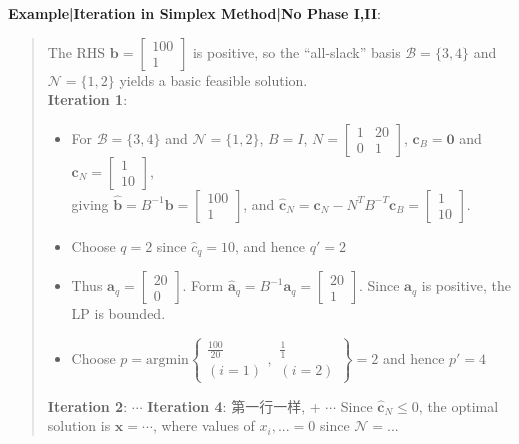 \documentclass[9pt]{article}
\begin{document}
\textbf{Example|Iteration in Simplex Method|No Phase I,II}:

\vspace{-10pt}
\begin{quote}
    \color{gray}
    \fontsize{7pt}{4pt}\selectfont
    The RHS \( \mathbf{b} = \begin{bmatrix} 100\\ 1\end{bmatrix}\) is positive, so the ``all-slack'' basis \( \mathcal{B}=\{3,4\} \) and \(\mathcal{N}=\{1,2\}\) yields a basic feasible solution. \\
    \textbf{Iteration 1}:
    \begin{itemize}[itemsep=-1pt, topsep=-1pt]
        \item For \( \mathcal{B}=\{3,4\} \) and \( \mathcal{N}=\{1,2\} \), \(B= I\), \(N=\begin{bmatrix} 1 & 20 \\ 0 & 1\end{bmatrix}\), \( \mathbf{c}_B=\mathbf{0} \) and \( \mathbf{c}_N=\begin{bmatrix} 1 \\ 10\end{bmatrix}\), \\
        giving \( \widehat{\mathbf{b}}=B^{-1}\mathbf{b}=\begin{bmatrix} 100 \\ 1\end{bmatrix} \), and \( \widehat{\mathbf{c}}_N=\mathbf{c}_N-N^TB^{-T}\mathbf{c}_B=\begin{bmatrix} 1 \\ 10\end{bmatrix} \).
        \item Choose \(q=2\) since \( \widehat{c}_q= 10 \), and hence \( q'=2 \)
        \item Thus \(\mathbf{a}_q=\begin{bmatrix}20 \\ 0\end{bmatrix}\). Form \( \widehat{\mathbf{a}}_q=B^{-1}\mathbf{a}_q=\begin{bmatrix} 20 \\ 1\end{bmatrix} \). Since \( \widehat{\mathbf{a}}_q \) is positive, the LP is bounded.
        \item Choose \(p=\text{argmin}\left\{ \begin{matrix}\frac{100}{20} \\ (i=1)\end{matrix}, \begin{matrix}\frac{1}{1} \\ (i=2)\end{matrix}  \right\}=2 \) and hence \( p'=4 \)
    \end{itemize}
    \textbf{Iteration 2}: \(\cdots\)
    \textbf{Iteration 4}: 第一行一样, + \(\cdots\) Since \( \widehat{\mathbf{c}}_N \leq 0 \), the optimal solution is \( \mathbf{x}=\cdots \), where values of \( x_i,... = 0\) since \(\mathcal{N} = ...\)
\end{quote}
\vspace{-10pt}
\end{document}
